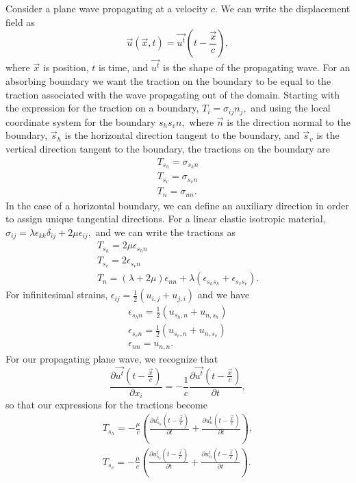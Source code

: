 Consider a plane wave propagating at a velocity $c$. We can write
the displacement field as
\begin{equation}
\vec{u}(\vec{x},t)=\vec{u^{t}}(t-\frac{\vec{x}}{c}),
\end{equation}
where $\vec{x}$ is position, $t$ is time, and $\vec{u^{t}}$ is
the shape of the propagating wave. For an absorbing boundary we want
the traction on the boundary to be equal to the traction associated
with the wave propagating out of the domain. Starting with the expression
for the traction on a boundary, $T_{i}=\sigma_{ij}n_{j},$ and using
the local coordinate system for the boundary $s_{h}s_{v}n,$ where
$\vec{n}$ is the direction normal to the boundary, $\overrightarrow{s}_{h}$
is the horizontal direction tangent to the boundary, and $\overrightarrow{s}_{v}$
is the vertical direction tangent to the boundary, the tractions on
the boundary are
\begin{gather}
T_{s_{h}}=\sigma_{s_{h}n}\\
T_{s_{v}}=\sigma_{s_{v}n}\\
T_{n}=\sigma_{nn}.
\end{gather}
In the case of a horizontal boundary, we can define an auxiliary direction
in order to assign unique tangential directions. For a linear elastic
isotropic material, $\sigma_{ij}=\lambda\epsilon_{kk}\delta_{ij}+2\mu\epsilon_{ij},$
and we can write the tractions as 
\begin{gather}
T_{s_{h}}=2\mu\epsilon_{s_{h}n}\\
T_{s_{v}}=2\epsilon_{s_{v}n}\\
T_{n}=(\lambda+2\mu)\epsilon_{nn}+\lambda(\epsilon_{s_{h}s_{h}}+\epsilon_{s_{v}s_{v}}).
\end{gather}
For infinitesimal strains, $\epsilon_{ij}=\frac{1}{2}(u_{i,j}+u_{j,i})$
and we have
\begin{gather}
\epsilon_{s_{h}n}=\frac{1}{2}(u_{s_{h},n}+u_{n,s_{h}})\\
\epsilon_{s_{v}n}=\frac{1}{2}(u_{s_{v},n}+u_{n,s_{v}})\\
\epsilon_{nn}=u_{n,n}.
\end{gather}
For our propagating plane wave, we recognize that
\begin{equation}
\frac{\partial\vec{u^{t}}(t-\frac{\vec{x}}{c})}{\partial x_{i}}=-\frac{1}{c}\frac{\partial\vec{u^{t}}(t-\frac{\vec{x}}{c})}{\partial t},
\end{equation}
so that our expressions for the tractions become
\begin{gather}
T_{s_{h}}=-\frac{\mu}{c}\left(\frac{\partial u_{s_{h}}^{t}(t-\frac{\vec{x}}{c})}{\partial t}+\frac{\partial u_{n}^{t}(t-\frac{\vec{x}}{c})}{\partial t}\right),\\
T_{s_{v}}=-\frac{\mu}{c}\left(\frac{\partial u_{s_{v}}^{t}(t-\frac{\vec{x}}{c})}{\partial t}+\frac{\partial u_{n}^{t}(t-\frac{\vec{x}}{c})}{\partial t}\right).
\end{gather}
